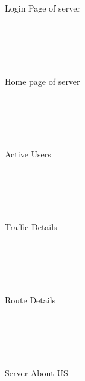 \\
\begin{figure}[ht]
{}\\
\caption{Login Page of server}
\end{figure}\\



\\
\begin{figure}[ht]
{}\\
\caption{Home page of server}
\end{figure}\\



\\
\begin{figure}[ht]
{}\\
\caption{Active Users}
\end{figure}\\



\\
\begin{figure}[ht]
{}\\
\caption{Traffic Details}
\end{figure}\\



\\
\begin{figure}[ht]
{}\\
\caption{Route Details}
\end{figure}\\



\\
\begin{figure}[ht]
{}\\
\caption{Server About US}
\end{figure}\\[1 cm]